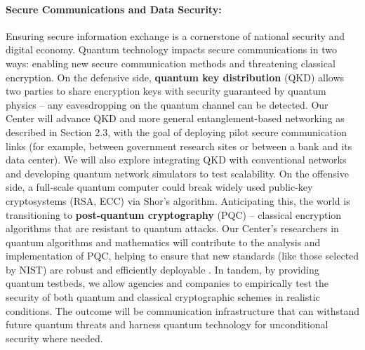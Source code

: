 \documentclass[12pt]{article}
\begin{document}
\paragraph{Secure Communications and Data Security:} Ensuring secure information exchange is a cornerstone of national security and digital economy. Quantum technology impacts secure communications in two ways: enabling new secure communication methods and threatening classical encryption. On the defensive side, \textbf{quantum key distribution} (QKD) allows two parties to share encryption keys with security guaranteed by quantum physics – any eavesdropping on the quantum channel can be detected. Our Center will advance QKD and more general entanglement-based networking as described in Section 2.3, with the goal of deploying pilot secure communication links (for example, between government research sites or between a bank and its data center). We will also explore integrating QKD with conventional networks and developing quantum network simulators to test scalability. On the offensive side, a full-scale quantum computer could break widely used public-key cryptosystems (RSA, ECC) via Shor’s algorithm. Anticipating this, the world is transitioning to \textbf{post-quantum cryptography} (PQC) – classical encryption algorithms that are resistant to quantum attacks. Our Center’s researchers in quantum algorithms and mathematics will contribute to the analysis and implementation of PQC, helping to ensure that new standards (like those selected by NIST) are robust and efficiently deployable . In tandem, by providing quantum testbeds, we allow agencies and companies to empirically test the security of both quantum and classical cryptographic schemes in realistic conditions. The outcome will be communication infrastructure that can withstand future quantum threats and harness quantum technology for unconditional security where needed.
\end{document}
